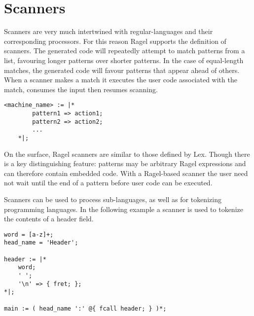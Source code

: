 \documentclass[letterpaper,11pt,oneside]{book}
\newcommand{\verbspace}{\vspace{10pt}}
\newenvironment{inline_code}{\def\baselinestretch{1}\vspace{12pt}\small}{}
\begin{document}


\section{Scanners}
\label{generating-scanners}

Scanners are very much intertwined with regular-languages and their
corresponding processors. For this reason Ragel supports the definition of
scanners.  The generated code will repeatedly attempt to match patterns from a
list, favouring longer patterns over shorter patterns.  In the case of
equal-length matches, the generated code will favour patterns that appear ahead
of others. When a scanner makes a match it executes the user code associated
with the match, consumes the input then resumes scanning.

\verbspace
\begin{verbatim}
<machine_name> := |* 
        pattern1 => action1;
        pattern2 => action2;
        ...
    *|;
\end{verbatim}
\verbspace

On the surface, Ragel scanners are similar to those defined by Lex. Though
there is a key distinguishing feature: patterns may be arbitrary Ragel
expressions and can therefore contain embedded code. With a Ragel-based scanner
the user need not wait until the end of a pattern before user code can be
executed.

Scanners can be used to process sub-languages, as well as for tokenizing
programming languages. In the following example a scanner is used to tokenize
the contents of a header field.

\begin{inline_code}
\begin{verbatim}
word = [a-z]+;
head_name = 'Header';

header := |*
    word;
    ' ';
    '\n' => { fret; };
*|;

main := ( head_name ':' @{ fcall header; } )*;
\end{verbatim}
\end{inline_code}
\verbspace
\end{document}
